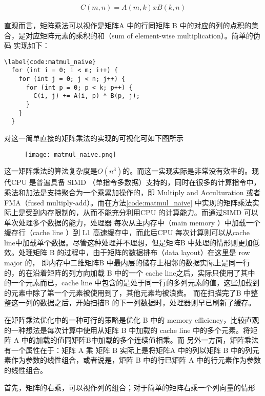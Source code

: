\begin{align}
  C(m, n) = A(m, k) x B(k, n)
\end{align}

直观而言，矩阵乘法可以视作是矩阵A 中的行同矩阵 B 中的对应的列的点积的集合，是对应矩阵元素的乘积的和（sum of element-wise multiplication）。简单的伪码
实现如下：

\begin{lstlisting}
\label{code:matmul_naive}
  for (int i = 0; i < m; i++) {
    for (int j = 0; j < n; j++) {
      for (int p = 0; p < k; p++) {
        C(i, j) += A(i, p) * B(p, j);
      }
    }
  }
\end{lstlisting}

对这一简单直接的矩阵乘法的实现的可视化可如下图所示

\begin{figure}
\texttt{[image: matmul\_naive.png]}
\end{figure}

这一矩阵乘法的算法复杂度是$O(n^3)$的。而这一实现实际是非常没有效率的。现代CPU 是普遍具备 SIMD （单指令多数据）支持的，同时在很多的计算指令中，乘法和加法是支持聚合为一个乘累加操作的，即 Multiply and 
Acculturation 或者 FMA（fused multiply-add）。而在方法\ref{code:matmul_naive} 中实现的矩阵乘法实际上是受到内存限制的，从而不能充分利用CPU 的计算能力。而通过SIMD 可以单次处理多个数据的能力，处理器
每次从主内存中（main memory ）中加载一个缓存行（cache line ）到 L1 高速缓存中，而此后CPU 每次计算则可以从cache line中加载单个数据。尽管这种处理并不理想，但是矩阵B 中处理的情形则更加低效。处理矩阵 B
的过程中，由于矩阵的数据排布（data layout）在这里是 row major 的， 即内存中二维矩阵B 中最内层的储存上相邻的数据实际上是同一行的，的在沿着矩阵的列方向加载 B 中的一个 cache line之后，实际只使用了其中
的一个元素而已，cache line 中包含的是处于同一行的多列元素的值，这些加载到的元素中除了第一个元素被使用到了，其他元素均被浪费。
而在扫描完了B 中整整这一列的数据之后，开始扫描B 的下一列数据时，处理器则早已刷新了缓存。

在矩阵乘法优化中的一种可行的策略是优化 B 中的 memory efficiency，比较直观的一种想法是每次计算中使用从矩阵 B 中加载的 cache line 中的多个元素。将矩阵 A 中的加载的值同矩阵B中加载的多个连续值相乘。而
另外一方面，矩阵乘法有一个属性在于：矩阵 A 乘 矩阵 B 实际上是将矩阵A 中的列以矩阵 B 中的列元素作为参数的线性组合，或者说是，矩阵 B 中的行已矩阵 A 中的行元素作为参数的线性组合。

首先，矩阵的右乘，可以视作列的组合；对于简单的矩阵右乘一个列向量的情形

